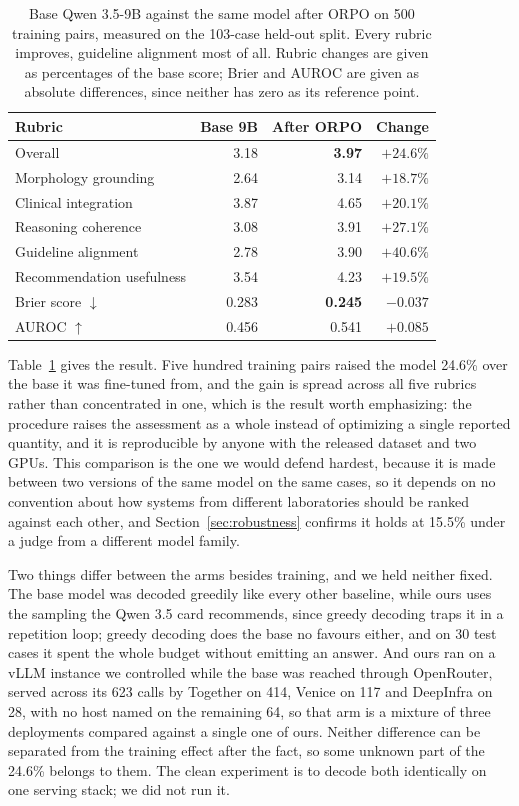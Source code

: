 \documentclass[11pt]{article}
\begin{document}
\begin{table}[H]
\centering
\small
\begin{tabular}{lrrr}
\toprule
\textbf{Rubric} & \textbf{Base 9B} & \textbf{After ORPO} & \textbf{Change} \\
\midrule
Overall & 3.18 & \textbf{3.97} & $+24.6\%$ \\
Morphology grounding & 2.64 & 3.14 & $+18.7\%$ \\
Clinical integration & 3.87 & 4.65 & $+20.1\%$ \\
Reasoning coherence & 3.08 & 3.91 & $+27.1\%$ \\
Guideline alignment & 2.78 & 3.90 & $+40.6\%$ \\
Recommendation usefulness & 3.54 & 4.23 & $+19.5\%$ \\
\midrule
Brier score $\downarrow$ & 0.283 & \textbf{0.245} & $-0.037$ \\
AUROC $\uparrow$ & 0.456 & 0.541 & $+0.085$ \\
\bottomrule
\end{tabular}
\caption{Base Qwen 3.5-9B against the same model after ORPO on 500 training
pairs, measured on the 103-case held-out split. Every rubric improves, guideline
alignment most of all. Rubric changes are given as percentages of the base score;
Brier and AUROC are given as absolute differences, since neither has zero as its
reference point.}
\label{tab:orpo}
\end{table}

Table~\ref{tab:orpo} gives the result. Five hundred training pairs raised the
model 24.6\% over the base it was fine-tuned from, and the gain is spread across
all five rubrics rather than concentrated in one, which is the result worth emphasizing: the procedure raises
the assessment as a whole instead of optimizing a single reported quantity, and it is reproducible by
anyone with the released dataset and two GPUs. This comparison is the one we
would defend hardest, because it is made between two versions of the same model
on the same cases, so it depends on no convention about how systems from
different laboratories should be ranked against each other, and
Section~\ref{sec:robustness} confirms it holds at 15.5\% under a judge from a
different model family.

Two things differ between the arms besides training, and we held neither fixed.
The base model was decoded greedily like every other baseline, while ours uses
the sampling the Qwen 3.5 card recommends, since greedy decoding traps it in a
repetition loop; greedy decoding does the base no favours either, and on 30 test
cases it spent the whole budget without emitting an answer. And ours ran on a
vLLM instance we controlled while the base was reached through OpenRouter, served
across its 623 calls by Together on 414, Venice on 117 and DeepInfra on 28, with
no host named on the remaining 64, so that arm is a mixture of three deployments
compared against a single one of ours. Neither difference can be separated from
the training effect after the fact, so some unknown part of the 24.6\% belongs to
them. The clean experiment is to decode both identically on one serving stack; we
did not run it.
\end{document}
